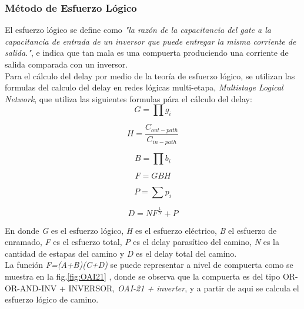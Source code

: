 \documentclass[12pt,a4paper]{article} %
\begin{document}
\subsubsection{Método de Esfuerzo Lógico}

El esfuerzo lógico se define como \textit{"la razón de la capacitancia del gate a la capacitancia de entrada de un inversor que puede entregar la misma corriente de salida."}, e indica que tan mala es una compuerta produciendo una corriente de salida comparada con un inversor.\\

Para el cálculo del delay por medio de la teoría de esfuerzo lógico, se utilizan las formulas del calculo del delay en redes lógicas multi-etapa, \textit{Multistage Logical Network}, que utiliza las siguientes formulas pára el cálculo del delay:\\

\begin{equation}\label{eqn:esfuerzo_logico}
G= \prod g_{i}
\end{equation}

\begin{equation}\label{eqn:esfuerzo_electrico}
H= \frac{C_{out-path}}{C_{in-path}}
\end{equation}

\begin{equation}\label{eqn:esfuerzo_enramado}
B= \prod b_{i}
\end{equation}

\begin{equation}\label{eqn:esfuerzo}
F = GBH
\end{equation}

\begin{equation}\label{eqn:delay_parasitico}
P = \sum p_{i}
\end{equation}

\begin{equation}\label{eqn:delay}
D = NF^{\frac{1}{N}} + P
\end{equation}

En donde \textit{G} es el esfuerzo lógico, \textit{H} es el esfuerzo eléctrico, \textit{B} el esfuerzo de enramado, \textit{F} es el esfuerzo total, \textit{P} es el delay parasítico del camino, \textit{N} es la cantidad de estapas del camino y \textit{D} es el delay total del camino.\\

La función \textit{F=(A+B)(C+D)} se puede representar a nivel de compuerta como se muestra en la fig.\ref{fig:OAI21} , donde se observa que la compuerta es del tipo OR-OR-AND-INV + INVERSOR, \textit{OAI-21 + inverter}, y a partir de aqui se calcula el esfuerzo lógico de camino.\\
\end{document}
